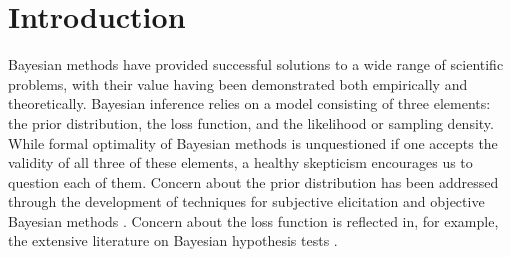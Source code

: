 \documentclass[ba]{imsart}
\begin{document}
\begin{frontmatter}

\begin{keyword}
\end{keyword}

\end{frontmatter}

\section{Introduction}
Bayesian methods have provided successful solutions to a wide range of scientific problems, with their value
having been demonstrated both empirically and theoretically.  Bayesian inference relies on a model consisting of three elements:  the prior distribution, the loss function, and the likelihood or sampling density.  While formal optimality of Bayesian methods is unquestioned if one accepts the validity of all three of these elements, a healthy skepticism encourages us to question each of them.  Concern about the prior distribution has been addressed through the development of techniques for subjective elicitation \citep{garthwaite2005, ohagan2006} and objective Bayesian methods \citep{berger2006}.  Concern about the loss function is reflected in, for example, the extensive literature on Bayesian hypothesis tests \citep{kass1995}.  
\end{document}
